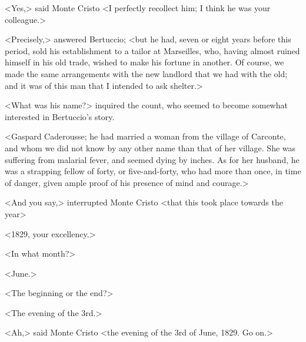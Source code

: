  <Yes,> said Monte Cristo <I perfectly recollect him; I think he was your colleague.> 

 <Precisely,> answered Bertuccio; <but he had, seven or eight years before this period, sold his establishment to a tailor at Marseilles, who, having almost ruined himself in his old trade, wished to make his fortune in another. Of course, we made the same arrangements with the new landlord that we had with the old; and it was of this man that I intended to ask shelter.> 

 <What was his name?> inquired the count, who seemed to become somewhat interested in Bertuccio's story. 

 <Gaspard Caderousse; he had married a woman from the village of Carconte, and whom we did not know by any other name than that of her village. She was suffering from malarial fever, and seemed dying by inches. As for her husband, he was a strapping fellow of forty, or five-and-forty, who had more than once, in time of danger, given ample proof of his presence of mind and courage.> 

 <And you say,> interrupted Monte Cristo <that this took place towards the year\longdash> 

 <1829, your excellency.> 

 <In what month?> 

 <June.> 

 <The beginning or the end?> 

 <The evening of the 3rd.>

<Ah,> said Monte Cristo <the evening of the 3rd of June, 1829. Go on.> 


